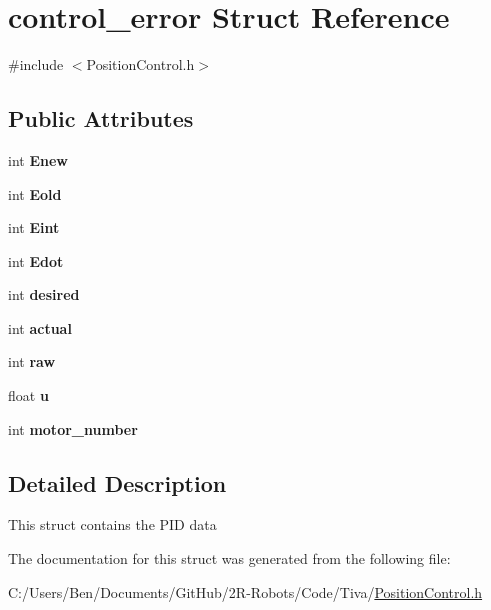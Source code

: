 \hypertarget{structcontrol__error}{}\section{control\+\_\+error Struct Reference}
\label{structcontrol__error}


{\ttfamily \#include $<$Position\+Control.\+h$>$}

\subsection*{Public Attributes}
\begin{DoxyCompactItemize}
\item 
\mbox{\label{structcontrol__error_a520d0aa203dfb6a8fc2ef6ea67742634}} 
int {\bfseries Enew}
\item 
\mbox{\label{structcontrol__error_a544db3cda64df9fdd64338941e583d3c}} 
int {\bfseries Eold}
\item 
\mbox{\label{structcontrol__error_a0134001840bac616204e9b36ce7fc53e}} 
int {\bfseries Eint}
\item 
\mbox{\label{structcontrol__error_a5a4f2cb0d9739ecbc2391462d4b0f07d}} 
int {\bfseries Edot}
\item 
\mbox{\label{structcontrol__error_a50083d46933f91ac7af1ab23eda49ddb}} 
int {\bfseries desired}
\item 
\mbox{\label{structcontrol__error_a45eeafb4f62fb62128e4f1dde8b134db}} 
int {\bfseries actual}
\item 
\mbox{\label{structcontrol__error_a872f13c1886cb584b7043e668b188548}} 
int {\bfseries raw}
\item 
\mbox{\label{structcontrol__error_acf5c228017b873e0db8d1e5a4c6cd87c}} 
float {\bfseries u}
\item 
\mbox{\label{structcontrol__error_ae5b0520c50ceefb1b0493a5086db1210}} 
int {\bfseries motor\+\_\+number}
\end{DoxyCompactItemize}


\subsection{Detailed Description}
This struct contains the P\+ID data 

The documentation for this struct was generated from the following file\+:\begin{DoxyCompactItemize}
\item 
C\+:/\+Users/\+Ben/\+Documents/\+Git\+Hub/2\+R-\/\+Robots/\+Code/\+Tiva/\mbox{\hyperlink{_position_control_8h}{Position\+Control.\+h}}\end{DoxyCompactItemize}
